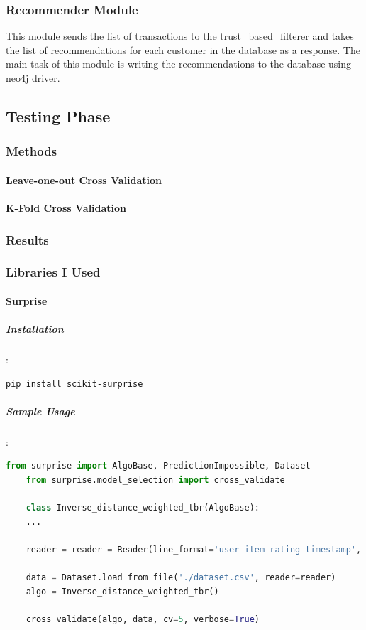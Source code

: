 \documentclass[12pt]{article}
\begin{document}
	\subsubsection{Recommender Module} This module sends the list of transactions to the trust\_based\_filterer and takes the list of recommendations for each customer in the database as a response. The main task of this module is writing the recommendations to the database using neo4j driver.
	
	\subsection{Testing Phase}
	\subsubsection{Methods}
	\paragraph{Leave-one-out Cross Validation}
	\paragraph{K-Fold Cross Validation}
	\subsubsection{Results}
	\subsubsection{Libraries I Used}
	\paragraph{Surprise}
	\subparagraph{Installation}:
	\begin{lstlisting}[language=bash]
	pip install scikit-surprise
	\end{lstlisting}
	
	\subparagraph{Sample Usage}:
	\begin{lstlisting}[language=python, caption=Surprise example]
	from surprise import AlgoBase, PredictionImpossible, Dataset
	from surprise.model_selection import cross_validate
	
	class Inverse_distance_weighted_tbr(AlgoBase):
	...
	
	reader = reader = Reader(line_format='user item rating timestamp', sep=';', rating_scale=(1, 5))
	
	data = Dataset.load_from_file('./dataset.csv', reader=reader)
	algo = Inverse_distance_weighted_tbr()
	
	cross_validate(algo, data, cv=5, verbose=True)
	\end{lstlisting}
	
\end{document}
